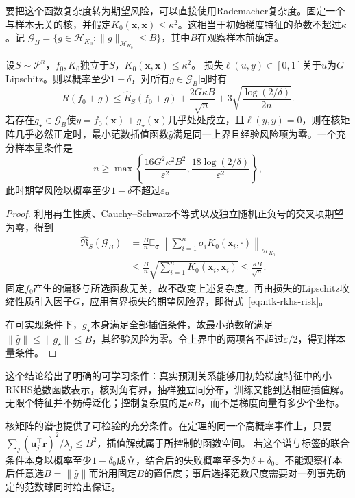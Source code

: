 要把这个函数复杂度转为期望风险，可以直接使用Rademacher复杂度。固定一个与样本无关的核，并假定$K_0(\bm x,\bm x)\leq\kappa^2$。这相当于初始梯度特征的范数不超过$\kappa$。记
$\mathcal G_B=\{g\in\mathcal H_{K_0}:\|g\|_{\mathcal H_{K_0}}\leq B\}$，其中$B$在观察样本前确定。

\begin{theorem}[初始梯度特征的期望风险界]
\label{thm:ntk-rkhs-risk}
设$S\sim\mathcal P^n$，$f_0,K_0$独立于$S$，$K_0(\bm x,\bm x)\leq\kappa^2$。
损失$\ell(u,y)\in[0,1]$关于$u$为$G$-Lipschitz。则以概率至少$1-\delta$，对所有$g\in\mathcal G_B$同时有
\begin{equation}
 R(f_0+g)\leq\hat R_S(f_0+g)
       +\frac{2G\kappa B}{\sqrt n}
       +3\sqrt{\frac{\log(2/\delta)}{2n}}.
 \label{eq:ntk-rkhs-risk}
\end{equation}
若存在$g_\star\in\mathcal G_B$使$y=f_0(\bm x)+g_\star(\bm x)$几乎处处成立，且$\ell(y,y)=0$，则在核矩阵几乎必然正定时，最小范数插值函数$\widehat g$满足同一上界且经验风险项为零。一个充分样本量条件是
\[
 n\geq\max\left\{\frac{16G^2\kappa^2B^2}{\varepsilon^2},
                  \frac{18\log(2/\delta)}{\varepsilon^2}\right\},
\]
此时期望风险以概率至少$1-\delta$不超过$\varepsilon$。
\end{theorem}
\begin{proof}
利用再生性质、Cauchy--Schwarz不等式以及独立随机正负号的交叉项期望为零，得到
\begin{align*}
 \widehat{\mathfrak R}_S(\mathcal G_B)
 &=\frac Bn\mathbb E_{\bm\sigma}
       \left\|\sum_{i=1}^n\sigma_i K_0(\bm x_i,\cdot)\right\|_{\mathcal H_{K_0}}\\
 &\leq\frac Bn\sqrt{\sum_{i=1}^nK_0(\bm x_i,\bm x_i)}
 \leq\frac{\kappa B}{\sqrt n}.
\end{align*}
固定$f_0$产生的偏移与所选函数无关，故不改变上述复杂度。再由损失的Lipschitz收缩性质引入因子$G$，应用有界损失的期望风险界，即得式~\eqref{eq:ntk-rkhs-risk}。

在可实现条件下，$g_\star$本身满足全部插值条件，故最小范数解满足$\|\widehat g\|\leq\|g_\star\|\leq B$，其经验风险为零。令上界中的两项各不超过$\varepsilon/2$，得到样本量条件。
\end{proof}

这个结论给出了明确的可学习条件：真实预测关系能够用初始梯度特征中的小RKHS范数函数表示，核对角有界，抽样独立同分布，训练又能到达相应插值解。无限个特征并不妨碍泛化；控制复杂度的是$\kappa B$，而不是梯度向量有多少个坐标。

核矩阵的谱也提供了可检验的充分条件。在定理的同一个高概率事件上，只要
$\sum_j(\bm u_j^\top\bm r)^2/\lambda_j\leq B^2$，插值解就属于所控制的函数空间。
若这个谱与标签的联合条件本身以概率至少$1-\delta_0$成立，结合后的失败概率至多为$\delta+\delta_0$。不能观察样本后任意选$B=\|\widehat g\|$而沿用固定$B$的置信度；事后选择范数尺度需要对一列事先确定的范数球同时给出保证。

